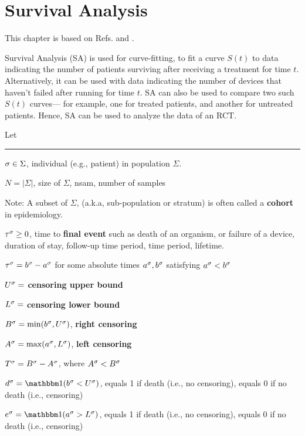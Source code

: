 \chapter{Survival Analysis}
\label{ch-survival}

This chapter is based
on Refs.\cite{lily-xu-284} and \cite{wiki-survival-anal}.

Survival Analysis (SA) is used for curve-fitting, to
fit a curve $S(t)$ to data indicating the number of patients surviving
after receiving a treatment for time $t$.
Alternatively, it can be used with data indicating  the number of
devices that haven't failed after running for time $t$.
SA can also be used  to compare two such $S(t)$ curves---
for example, one for treated patients, and another for untreated
patients. Hence, SA can be used to analyze the data of an RCT.

Let
\hrule

$\sigma\in \Sigma$, individual (e.g., patient) in population $\Sigma$.

$N=|\Sigma|$,  size of $\Sigma$, nsam, number of samples

Note: A subset of $\Sigma$, (a.k.a, sub-population
or stratum)
is often called a {\bf cohort}
in epidemiology.

$\tau^\sigma\geq 0$, time to
{\bf final event} such as death of an organism, or failure
of a device, duration of stay,
follow-up time period,
time period,
lifetime.

$\tau^\sigma = b^\sigma -a^\sigma$ for some absolute times
$a^\sigma, b^\sigma$ satisfying
$a^\sigma<b^\sigma$

$U^\sigma=$ {\bf censoring upper bound}

$L^\sigma=$ {\bf censoring lower bound}

$B^\sigma = \min(b^\sigma, U^\sigma)$, {\bf right censoring}

$A^\sigma = \max(a^\sigma, L^\sigma)$, {\bf left censoring}

$T^\sigma = B^\sigma - A^\sigma$, where $A^\sigma<B^\sigma$

$d^\s = \indi(b^\s < U^\s)$, equals 1
if death (i.e., no censoring),
equals 0 if no death (i.e., censoring)

$e^\s = \indi(a^\s > L^\s)$, equals 1
if death (i.e., no censoring),
equals 0 if no death (i.e., censoring)


